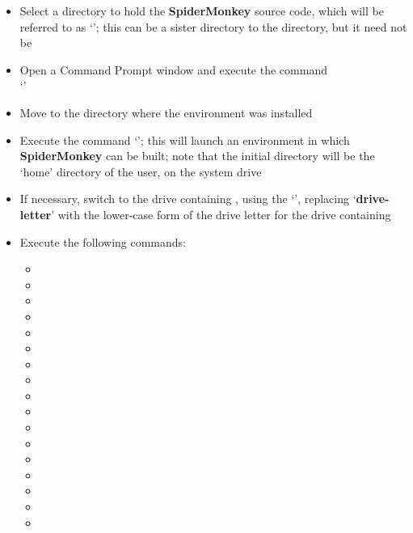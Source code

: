 \tertiaryEnd{}
\begin{itemize}
\item Select a directory to hold the \textbf{SpiderMonkey} source code, which will be
referred to as `'; this can be a sister directory to the
 directory, but it need not be
\item\exSp{} Open a Command Prompt window and execute the command\\
`'
\item\exSp{} Move to the directory where the  environment was
installed
\item\exSp{} Execute the command `'; this will launch
an environment in which \textbf{SpiderMonkey} can be built; note that the initial
directory will be the `home' directory of the user, on the system drive
\item\exSp{} If necessary, switch to the drive containing ,
using the `', replacing `\textbf{drive-letter}' with
the lower-case form of the drive letter for the drive containing
\item\exSp{} Execute the following commands:
\begin{itemize}
\item{}
\item\exSp{}
\item\exSp{}
\item\exSp{}
\item\exSp{}
\item\exSp{}
\item\exSp{}
\item\exSp{}
\item\exSp{}
\item\exSp{}
\item\exSp{}
\item\exSp{}
\item\exSp{}
\item\exSp{}
\item\exSp{}
\item\exSp{}
\item\exSp{}
\end{itemize}
\end{itemize}
